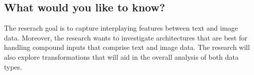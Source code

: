 \subsection{What would you like to know?}

The reserach goal is to capture interplaying features between text and image data.  Moreover, the research wants to investigate architectures that are best for handling compound inputs that comprise text and image data.  The research will also explore transformations that will aid in the overall analysis of both data types.


